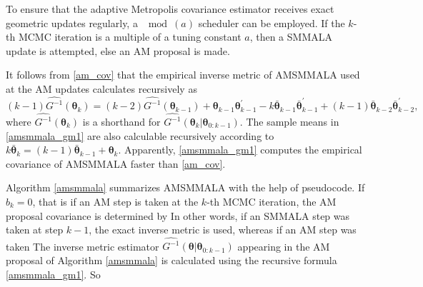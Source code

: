 \documentclass[twoside,11pt]{article}
\begin{document}
To ensure that the adaptive Metropolis covariance estimator receives exact geometric updates regularly, a $\mod{(a)}$ 
scheduler can be employed. If the $k$-th MCMC iteration is a multiple of a tuning constant $a$, then a SMMALA update is 
attempted, else an AM proposal is made.

It follows from \eqref{am_cov} that the empirical inverse metric of AMSMMALA used at the AM updates calculates recursively as
\begin{equation}
\label{amsmmala_gm1}
(k-1)\widehat{G^{-1}}(\boldsymbol{\theta}_{k})=
(k-2)\widehat{G^{-1}}(\boldsymbol{\theta}_{k-1})+
\boldsymbol{\theta}_{k-1} \boldsymbol{\theta}_{k-1}^{'}-
k\bar{\boldsymbol{\theta}}_{k-1} \bar{\boldsymbol{\theta}}_{k-1}^{'}+
(k-1)\bar{\boldsymbol{\theta}}_{k-2} \bar{\boldsymbol{\theta}}_{k-2}^{'},
\end{equation}
where $\widehat{G^{-1}}(\boldsymbol{\theta}_{k})$ is a shorthand for 
$\widehat{G^{-1}}(\boldsymbol{\theta}_{k}|\boldsymbol{\theta}_{0:k-1})$.
The sample means in \eqref{amsmmala_gm1} are also calculable recursively according to
$k\bar{\boldsymbol{\theta}}_k=(k-1)\bar{\boldsymbol{\theta}}_{k-1}+\boldsymbol{\theta}_k$. Apparently, \eqref{amsmmala_gm1}
computes the empirical covariance of AMSMMALA faster than \eqref{am_cov}.

Algorithm \ref{amsmmala} summarizes AMSMMALA with the help of pseudocode.
If $b_k=0$, that is if an AM step is taken at the $k$-th MCMC iteration, the AM proposal covariance is determined by
In other words, if an SMMALA step was taken at step $k-1$, the exact inverse metric is used, whereas if an AM step was taken
The inverse metric estimator $\widehat{G^{-1}}(\boldsymbol{\theta}|\boldsymbol{\theta}_{0:k-1})$ appearing in the AM 
proposal of Algorithm \ref{amsmmala} is calculated using the recursive formula \eqref{amsmmala_gm1}. So
\end{document}
